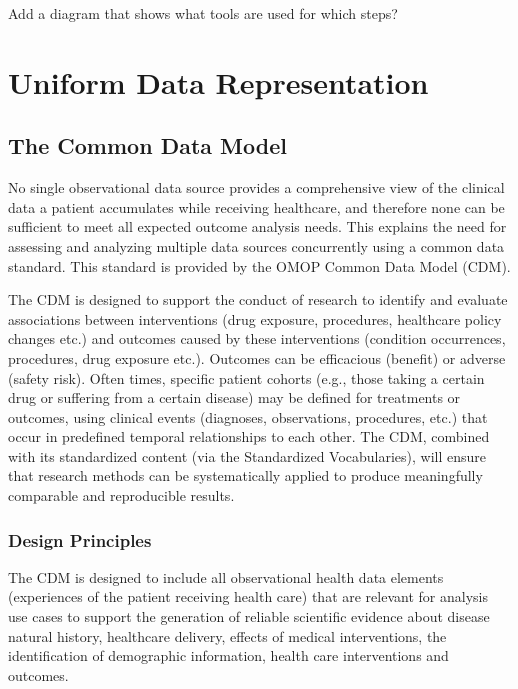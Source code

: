 \documentclass[]{book}
\begin{document}
Add a diagram that shows what tools are used for which steps?

\part{Uniform Data
Representation}\label{part-uniform-data-representation}

\chapter{The Common Data Model}\label{CommonDataModel}

No single observational data source provides a comprehensive view of the
clinical data a patient accumulates while receiving healthcare, and
therefore none can be sufficient to meet all expected outcome analysis
needs. This explains the need for assessing and analyzing multiple data
sources concurrently using a common data standard. This standard is
provided by the OMOP Common Data Model (CDM).

The CDM is designed to support the conduct of research to identify and
evaluate associations between interventions (drug exposure, procedures,
healthcare policy changes etc.) and outcomes caused by these
interventions (condition occurrences, procedures, drug exposure etc.).
Outcomes can be efficacious (benefit) or adverse (safety risk). Often
times, specific patient cohorts (e.g., those taking a certain drug or
suffering from a certain disease) may be defined for treatments or
outcomes, using clinical events (diagnoses, observations, procedures,
etc.) that occur in predefined temporal relationships to each other. The
CDM, combined with its standardized content (via the Standardized
Vocabularies), will ensure that research methods can be systematically
applied to produce meaningfully comparable and reproducible results.

\section{Design Principles}\label{design-principles}

The CDM is designed to include all observational health data elements
(experiences of the patient receiving health care) that are relevant for
analysis use cases to support the generation of reliable scientific
evidence about disease natural history, healthcare delivery, effects of
medical interventions, the identification of demographic information,
health care interventions and outcomes.
\end{document}
